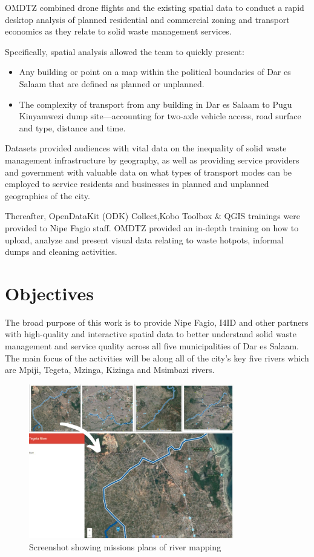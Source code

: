 \documentclass[a4paper,12pt,twoside]{article}
\begin{document}
OMDTZ  combined drone flights and the existing spatial data to conduct a rapid desktop analysis of planned residential and commercial zoning and transport economics as they relate to solid waste management services.

Specifically, spatial analysis allowed the team to quickly present:
\begin{itemize}
    \item Any building or point on a map within the political boundaries of Dar es Salaam that are defined as planned or unplanned.
    \item The complexity of transport from any building in Dar es Salaam to Pugu Kinyamwezi dump site---accounting for two-axle vehicle access, road surface and type, distance and time. 
\end{itemize}
    
Datasets provided audiences with vital data on the inequality of solid waste management infrastructure by geography, as well as providing service providers and government with valuable data on what types of transport modes can be employed to service residents and businesses in planned and unplanned geographies of the city.  

Thereafter, OpenDataKit (ODK) Collect,Kobo Toolbox & QGIS trainings were provided to Nipe Fagio staff. OMDTZ provided an in-depth training on how to upload, analyze and present visual data relating to waste hotpots, informal dumps and cleaning activities.


\newpage
\section{Objectives}

    The broad purpose of this work is to provide Nipe Fagio, I4ID and other partners with high-quality and interactive spatial data to better understand solid waste management and service quality across all five municipalities of Dar es Salaam. The main focus of the activities will be along all of the city’s key five rivers which are Mpiji, Tegeta, Mzinga, Kizinga and Msimbazi rivers.

        \begin{figure}%
            \centering
            \includegraphics[width=0.8\textwidth]{images/image14.jpg}
            \caption{Screenshot showing missions plans of river mapping}
        \end{figure}
\end{document}
